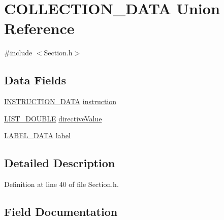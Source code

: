\hypertarget{union_c_o_l_l_e_c_t_i_o_n___d_a_t_a}{}\section{C\+O\+L\+L\+E\+C\+T\+I\+O\+N\+\_\+\+D\+A\+TA Union Reference}
\label{union_c_o_l_l_e_c_t_i_o_n___d_a_t_a}


{\ttfamily \#include $<$Section.\+h$>$}

\subsection*{Data Fields}
\begin{DoxyCompactItemize}
\item 
\mbox{\hyperlink{struct_i_n_s_t_r_u_c_t_i_o_n___d_a_t_a}{I\+N\+S\+T\+R\+U\+C\+T\+I\+O\+N\+\_\+\+D\+A\+TA}} \mbox{\hyperlink{union_c_o_l_l_e_c_t_i_o_n___d_a_t_a_ae3d172a8ca561cb2c419b8cce6366f5c}{instruction}}
\item 
\mbox{\hyperlink{_double_list_generic_8h_a1e5b384fadfbaaa8da74a3c3212fae13}{L\+I\+S\+T\+\_\+\+D\+O\+U\+B\+LE}} \mbox{\hyperlink{union_c_o_l_l_e_c_t_i_o_n___d_a_t_a_a3bb9af16520fe251df4f2e990dee7b81}{directive\+Value}}
\item 
\mbox{\hyperlink{struct_l_a_b_e_l___d_a_t_a}{L\+A\+B\+E\+L\+\_\+\+D\+A\+TA}} \mbox{\hyperlink{union_c_o_l_l_e_c_t_i_o_n___d_a_t_a_ac8d2ad7f5ee5b7f800c2a7ed022f3280}{label}}
\end{DoxyCompactItemize}


\subsection{Detailed Description}


Definition at line 40 of file Section.\+h.



\subsection{Field Documentation}
\mbox{\label{union_c_o_l_l_e_c_t_i_o_n___d_a_t_a_a3bb9af16520fe251df4f2e990dee7b81}} 
